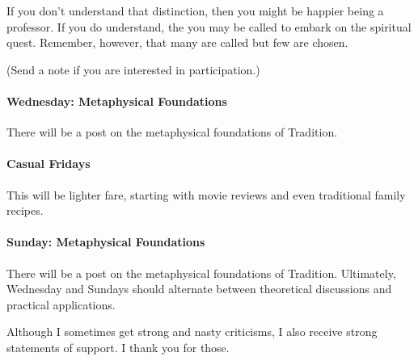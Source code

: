 If you don't understand that distinction, then you might be happier being a professor. If you do understand, the you may be called to embark on the spiritual quest. Remember, however, that many are called but few are chosen.

(Send a note if you are interested in participation.)

\paragraph{Wednesday: Metaphysical Foundations}


There will be a post on the metaphysical foundations of Tradition.

\paragraph{Casual Fridays}


This will be lighter fare, starting with movie reviews and even traditional family recipes.

\paragraph{Sunday: Metaphysical Foundations}


There will be a post on the metaphysical foundations of Tradition. Ultimately, Wednesday and Sundays should alternate between theoretical discussions and practical applications.

Although I sometimes get strong and nasty criticisms, I also receive strong statements of support. I thank you for those.



